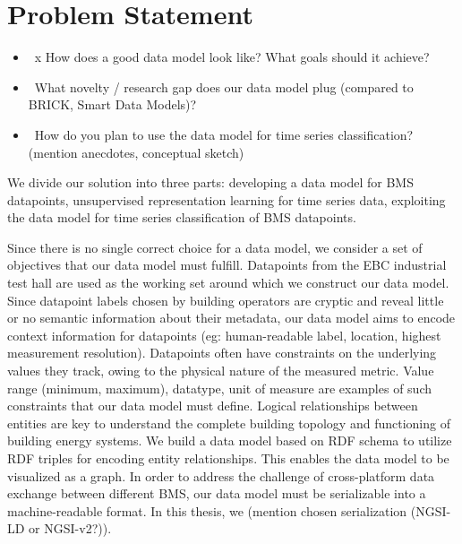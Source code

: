 \section{Problem Statement}

\begin{itemize}[label={}]
	\color{red}
		\item \lbrack\ x \rbrack How does a good data model look like? What goals should it achieve?
		\item \lbrack\  \rbrack What novelty / research gap does our data model plug (compared to BRICK, Smart Data Models)?
		\item \lbrack\  \rbrack How do you plan to use the data model for time series classification? (mention anecdotes, conceptual sketch)
\end{itemize}

We divide our solution into three parts: developing a data model for BMS datapoints, unsupervised representation learning for time series data, exploiting the data model for time series classification of BMS datapoints. 

Since there is no single correct choice for a data model, we consider a set of objectives that our data model must fulfill.
Datapoints from the EBC industrial test hall are used as the working set around which we construct our data model. Since datapoint labels chosen by building operators are cryptic and reveal little or no semantic information about their metadata, our data model aims to encode context information for datapoints (eg: human-readable label, location, highest measurement resolution).
Datapoints often have constraints on the underlying values they track, owing to the physical nature of the measured metric. Value range (minimum, maximum), datatype, unit of measure are examples of such constraints that our data model must define.
Logical relationships between entities are key to understand the complete building topology and functioning of building energy systems. We build a data model based on RDF schema to utilize RDF triples for encoding entity relationships. This enables the data model to be visualized as a graph.
In order to address the challenge of cross-platform data exchange between different BMS, our data model must be serializable into a machine-readable format. In this thesis, we (mention chosen serialization (NGSI-LD or NGSI-v2?)).

